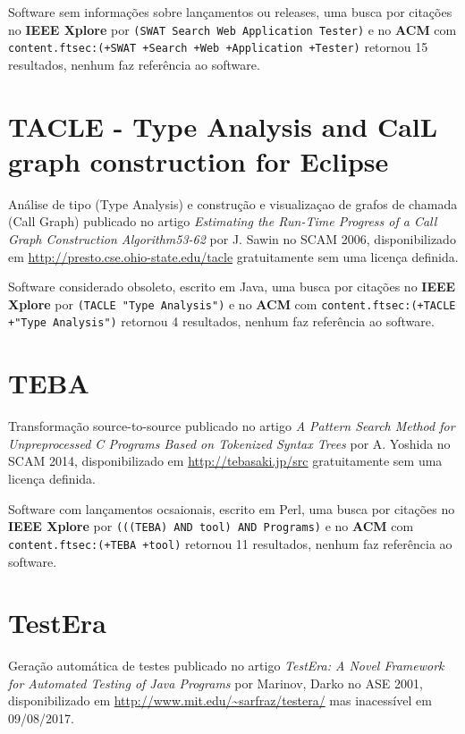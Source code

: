 Software sem informações sobre lançamentos ou releases,
uma busca por citações no {\bf IEEE Xplore} por
\texttt{(SWAT Search Web Application Tester)}
e no {\bf ACM} com
\texttt{content.ftsec:(+SWAT +Search +Web +Application +Tester)}
retornou
15 resultados,
nenhum faz referência ao software.



\section{TACLE - Type Analysis and CalL graph construction for Eclipse}

Análise de tipo (Type Analysis) e construção e visualizaçao de grafos de chamada (Call Graph)
publicado no artigo {\it Estimating the Run-Time Progress of a Call Graph Construction Algorithm53-62}
por J. Sawin
no SCAM 2006,
disponibilizado em \url{http://presto.cse.ohio-state.edu/tacle}
gratuitamente
sem uma licença definida.

Software considerado obsoleto,
escrito em Java,
uma busca por citações no {\bf IEEE Xplore} por
\texttt{(TACLE "Type Analysis")}
e no {\bf ACM} com
\texttt{content.ftsec:(+TACLE +"Type Analysis")}
retornou
4 resultados,
nenhum faz referência ao software.



\section{TEBA}

Transformação source-to-source
publicado no artigo {\it A Pattern Search Method for Unpreprocessed C Programs Based on Tokenized Syntax Trees}
por A. Yoshida
no SCAM 2014,
disponibilizado em \url{http://tebasaki.jp/src}
gratuitamente
sem uma licença definida.

Software com lançamentos ocsaionais,
escrito em Perl,
uma busca por citações no {\bf IEEE Xplore} por
\texttt{(((TEBA) AND tool) AND Programs)}
e no {\bf ACM} com
\texttt{content.ftsec:(+TEBA +tool)}
retornou
11 resultados,
nenhum faz referência ao software.



\section{TestEra}

Geração automática de testes
publicado no artigo {\it TestEra: A Novel Framework for Automated Testing of Java Programs}
por Marinov, Darko
no ASE 2001,
disponibilizado em \url{http://www.mit.edu/~sarfraz/testera/}
mas inacessível em 09/08/2017.


